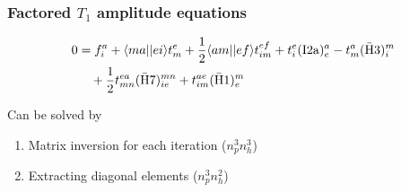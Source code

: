 \begin{frame}
    \frametitle{Factored $T_1$ amplitude equations}

\begin{align*}
    0 &= f_{i}^a + \langle ma||ei\rangle t_m^e + \frac{1}{2} \langle am||ef\rangle t_{im}^{ef}
        + t_i^e (\mathrm{I2a})_e^a - t_m^a (\mathrm{\bar{H}3})_i^m \notag \\
    & \quad + \frac{1}{2} t_{mn}^{ea} (\mathrm{\bar{H}7})_{ie}^{mn} + t_{im}^{ae} 
        (\mathrm{\bar{H}1})_e^m \notag \\
\end{align*}

Can be solved by
\begin{enumerate}
\item Matrix inversion for each iteration ($n_p^3 n_h^3$)
\item Extracting diagonal elements ($n_p^3 n_h^2$)
\end{enumerate}
\end{frame}

